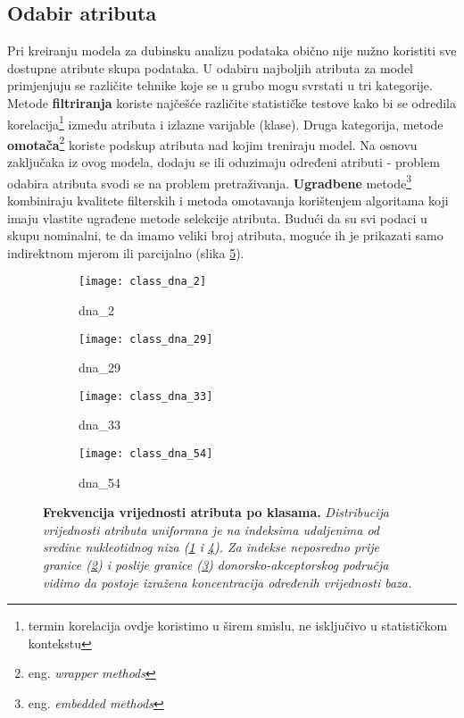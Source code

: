 \subsection{Odabir atributa}
Pri kreiranju modela za dubinsku analizu podataka obično nije nužno koristiti sve dostupne atribute skupa podataka. U odabiru najboljih atributa za model primjenjuju se različite tehnike koje se u grubo mogu svrstati u tri kategorije. Metode \textbf{filtriranja} koriste najčešće različite statističke testove kako bi se odredila korelacija\footnote{termin korelacija ovdje koristimo u širem smislu, ne isključivo u statističkom kontekstu} između atributa i izlazne varijable (klase). Druga kategorija, metode \textbf{omotača}\footnote{eng. \textit{wrapper methods}} koriste podskup atributa nad kojim treniraju model. Na osnovu zaključaka iz ovog modela, dodaju se ili oduzimaju određeni atributi - problem odabira atributa svodi se na problem pretraživanja. \textbf{Ugradbene} metode\footnote{eng. \textit{embedded methods}} kombiniraju kvalitete filterskih i metoda omotavanja korištenjem algoritama koji imaju vlastite ugrađene metode selekcije atributa.
Budući da su svi podaci u skupu nominalni, te da imamo veliki broj atributa, moguće ih je prikazati samo indirektnom mjerom ili parcijalno (slika \ref{fig:class_dna_x}).
\begin{center}
   \begin{figure}[ht!]
   \begin{subfigure}{.5\textwidth}
         \texttt{[image: class\_dna\_2]}
         \caption{dna{\_}2}
         \label{fig:class_dna_2}
   \end{subfigure}
   \begin{subfigure}{.5\textwidth}
         \texttt{[image: class\_dna\_29]}
         \caption{dna{\_}29}
         \label{fig:class_dna_29}
   \end{subfigure}
   \begin{subfigure}{.5\textwidth}
         \texttt{[image: class\_dna\_33]}
         \caption{dna{\_}33}
         \label{fig:class_dna_33}
   \end{subfigure}
   \begin{subfigure}{.5\textwidth}
         \texttt{[image: class\_dna\_54]}
         \caption{dna{\_}54}
         \label{fig:class_dna_54}
   \end{subfigure}
   \caption[Dijagram rasipanja vrijednosti atributa po klasama]
   {\textbf{Frekvencija vrijednosti atributa po klasama.}\textit{ Distribucija vrijednosti atributa uniformna je na indeksima udaljenima od sredine nukleotidnog niza (\ref{fig:class_dna_2} i \ref{fig:class_dna_54}). Za indekse neposredno prije granice (\ref{fig:class_dna_29}) i poslije granice (\ref{fig:class_dna_33}) donorsko-akceptorskog područja vidimo da postoje izražena koncentracija određenih vrijednosti baza.}}
    \label{fig:class_dna_x}
   \end{figure}
\end{center}
